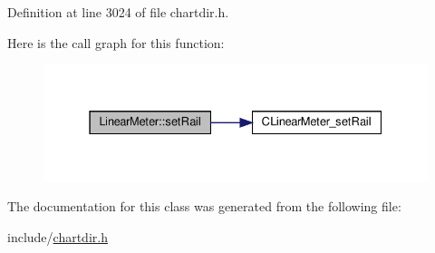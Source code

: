 Definition at line 3024 of file chartdir.\+h.

Here is the call graph for this function\+:
\nopagebreak
\begin{figure}[H]
\begin{center}
\leavevmode
\includegraphics[width=331pt]{class_linear_meter_a3ea47754984830027c4f543f23226748_cgraph}
\end{center}
\end{figure}


The documentation for this class was generated from the following file\+:\begin{DoxyCompactItemize}
\item 
include/\hyperlink{chartdir_8h}{chartdir.\+h}\end{DoxyCompactItemize}
